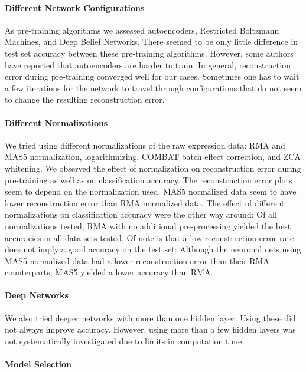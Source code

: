 \paragraph{Different Network Configurations}

As pre-training algorithms we assessed autoencoders, Restricted Boltzmann
Machines, and Deep Belief Networks. There seemed to be only little
difference in test set accuracy between these pre-training algorithms.
However, some authors have reported that autoencoders are harder to
train. In general, reconstruction error during pre-training converged
well for our cases. Sometimes one has to wait a few iterations for
the network to travel through configurations that do not seem to change
the resulting reconstruction error.

\paragraph{Different Normalizations}

We tried using different normalizations of the raw expression data:
RMA and MAS5 normalization, logarithmizing, COMBAT batch effect correction,
and ZCA whitening. We observed the effect of normalization on reconstruction
error during pre-training as well as on classification accuracy. The
reconstruction error plots seem to depend on the normalization used.
MAS5 normalized data seem to have lower reconstruction error than
RMA normalized data. The effect of different normalizations on classification
accuracy were the other way around: Of all normalizations tested,
RMA with no additional pre-processing yielded the best accuracies
in all data sets tested. Of note is that a low reconstruction error
rate does not imply a good accuracy on the test set: Although the
neuronal nets using MAS5 normalized data had a lower reconstruction
error than their RMA counterparts, MAS5 yielded a lower accuracy than
RMA.

\paragraph{Deep Networks}

We also tried deeper networks with more than one hidden layer. Using
these did not always improve accuracy. However, using more than a
few hidden layers was not systematically investigated due to limits
in computation time.

\paragraph{Model Selection}

